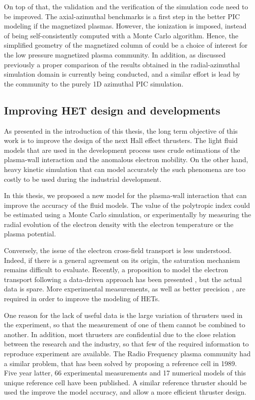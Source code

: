 On top of that, the validation and the verification of the simulation code need to be improved.
The axial-azimuthal benchmarks \citep{charoy2019} is a first step in the better PIC modeling if the magnetized plasmas.
However, the ionization is imposed, instead of being self-consistently computed with a Monte Carlo algorithm.
Hence, the simplified geometry of the magnetized column of \citet{lucken2019} could be a choice of interest for the low pressure magnetized plasma community.
In addition, as discussed previously a proper comparison of the results obtained in the radial-azimuthal simulation domain is currently being conducted, and a similar effort is lead by the community to the purely 1D azimuthal PIC simulation.

\subsection{Improving HET design and developments } 

As presented in the introduction of this thesis, the long term objective of this work is to improve the design of the next Hall effect thrusters.
The light fluid models that are used in the development process uses crude estimations of the plasma-wall interaction and the anomalous electron mobility.
On the other hand, heavy kinetic simulation that can model accurately the such phenomena are too costly to be used during the industrial development.

In this thesis, we proposed a new model for the plasma-wall interaction that can improve the accuracy of the fluid models.
The value of the polytropic index could be estimated using a Monte Carlo simulation, or experimentally by measuring the radial evolution of the electron density with the electron temperature or the plasma potential. 

Conversely, the issue of the electron cross-field transport is less understood.
Indeed, if there is a general agreement on its origin, the saturation mechanism remains difficult to evaluate.
Recently, a proposition to model the electron transport following a data-driven approach has been presented \citep{jorns2018}, but the actual data is spare.
More experimental measurements, as well as better precision \citep{mikellides2019}, are required in order to improve the modeling of HETs.

One reason for the lack of useful data is the large variation of thrusters used in the experiment, so that the measurement of one of them cannot be combined to another.
In addition, most thrusters are confidential due to the close relation between the research and the industry, so that few of the required information to reproduce experiment are available.
The Radio Frequency plasma community had a similar problem, that has been solved by proposing a reference cell in 1989\citep{olthoff1995}.
Five year latter, 66 experimental measurements and 17 numerical models of this unique reference cell have been published.
A similar reference thruster should be used the improve the model accuracy, and allow a more efficient thruster design.

